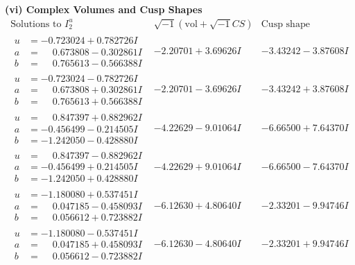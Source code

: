\documentclass[1p]{elsarticle_modified}
\theoremstyle{definition}
\newcommand{\I}{\sqrt{-1}}
\begin{document}
\newpage\flushleft \textbf{(vi) Complex Volumes and Cusp Shapes}
$$\begin{array}{c|c|c}  
\text{Solutions to }I^u_{2}& \I (\text{vol} + \sqrt{-1}CS) & \text{Cusp shape}\\
 \hline 
\begin{aligned}
u &= -0.723024 + 0.782726 I \\
a &= \phantom{-}0.673808 - 0.302861 I \\
b &= \phantom{-}0.765613 - 0.566388 I\end{aligned}
 & -2.20701 + 3.69626 I & -3.43242 - 3.87608 I \\ \hline\begin{aligned}
u &= -0.723024 - 0.782726 I \\
a &= \phantom{-}0.673808 + 0.302861 I \\
b &= \phantom{-}0.765613 + 0.566388 I\end{aligned}
 & -2.20701 - 3.69626 I & -3.43242 + 3.87608 I \\ \hline\begin{aligned}
u &= \phantom{-}0.847397 + 0.882962 I \\
a &= -0.456499 - 0.214505 I \\
b &= -1.242050 - 0.428880 I\end{aligned}
 & -4.22629 - 9.01064 I & -6.66500 + 7.64370 I \\ \hline\begin{aligned}
u &= \phantom{-}0.847397 - 0.882962 I \\
a &= -0.456499 + 0.214505 I \\
b &= -1.242050 + 0.428880 I\end{aligned}
 & -4.22629 + 9.01064 I & -6.66500 - 7.64370 I \\ \hline\begin{aligned}
u &= -1.180080 + 0.537451 I \\
a &= \phantom{-}0.047185 - 0.458093 I \\
b &= \phantom{-}0.056612 + 0.723882 I\end{aligned}
 & -6.12630 + 4.80640 I & -2.33201 - 9.94746 I \\ \hline\begin{aligned}
u &= -1.180080 - 0.537451 I \\
a &= \phantom{-}0.047185 + 0.458093 I \\
b &= \phantom{-}0.056612 - 0.723882 I\end{aligned}
 & -6.12630 - 4.80640 I & -2.33201 + 9.94746 I \\ \hline\begin{aligned}

\end{aligned}
\end{array}$$
\end{document}
